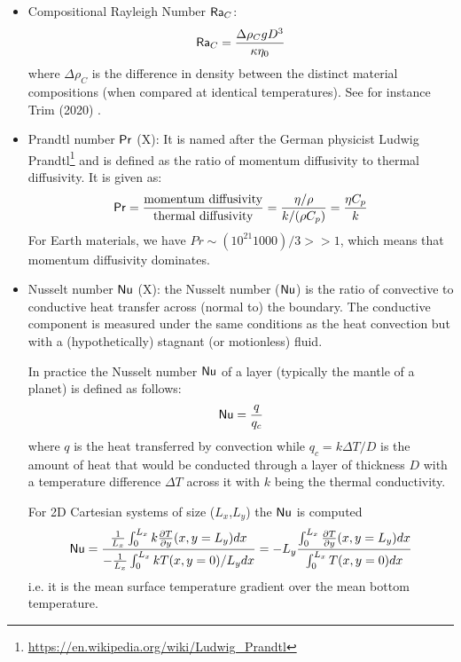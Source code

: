 \begin{itemize}
\item {\color{violet}Compositional Rayleigh Number} ${\mathsf{Ra}}_C$:  
\[
{\mathsf{Ra}}_C= \frac{\Delta \rho_C  g  D^3}{\kappa \eta_0}
\]
where $\Delta \rho_C$ is the difference in density between the distinct material compositions
(when compared at identical temperatures). See for instance Trim \etal (2020) \cite{trlb20}.

\item {\color{violet} Prandtl number} ${\mathsf{Pr}}$ (X):  
It is named after the German physicist 
Ludwig Prandtl\footnote{\url{https://en.wikipedia.org/wiki/Ludwig_Prandtl}} 
and is defined as the ratio of momentum diffusivity to thermal diffusivity. 
It is given as: 
\[
{\mathsf{Pr}} = \frac{\text{momentum diffusivity}}{\text{thermal diffusivity}} = \frac{\eta/\rho}{k/(\rho C_p)}= \frac{\eta C_p}{k}
\]
For Earth materials, we have $Pr \sim (10^{21} 1000)/3 >> 1$, 
which means that momentum diffusivity dominates.

\item {\color{violet} Nusselt number} ${\mathsf{Nu}}$ (X):   
the Nusselt number (${\mathsf{Nu}}$) 
is the ratio of convective to conductive heat transfer across (normal to) the boundary. 
The conductive component is measured under the same conditions as the heat convection 
but with a (hypothetically) stagnant (or motionless) fluid.

In practice the Nusselt number ${\mathsf{Nu}}$ of a layer (typically the mantle of a planet) is defined as follows:
\begin{equation}
{\mathsf{Nu}} = \frac{q}{q_c}
\end{equation} 
where $q$ is the heat transferred by convection while $q_c=k \Delta T /D$ 
is the amount of heat that would be conducted through a layer of
thickness $D$ with a temperature difference $\Delta T$ across it with 
$k$ being the thermal conductivity.

For 2D Cartesian systems of size ($L_x$,$L_y$) the ${\mathsf{Nu}}$ is computed \cite{blbc89}
\[
{\mathsf{Nu}} = 
\frac{\frac{1}{L_x}\int_{0}^{L_x} k \frac{\partial T}{\partial y}(x,y=L_y) dx }
{-\frac{1}{L_x}\int_0^{L_x} k T(x,y=0) /L_y dx}
=-L_y \frac{\int_{0}^{L_x} \frac{\partial T}{\partial y}(x,y=L_y) dx }{\int_0^{L_x} T(x,y=0) dx}
\]
i.e. it is the mean surface temperature gradient
over the mean bottom temperature.


\end{itemize}
